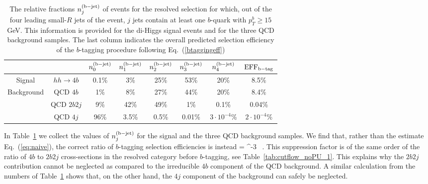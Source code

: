 \begin{table}[t]
  \centering
  \small
  \begin{tabular}{|c|c|c|c|c|c|c|c|}
    \hline
  \multicolumn{2}{|c|}{}   &  $n^{\rm (b-jet)}_0$  &  $n^{\rm (b-jet)}_1$  &  $n^{\rm (b-jet)}_2$  & $n^{\rm (b-jet)}_3$ &
    $n^{\rm (b-jet)}_4$ & ${\rm EFF}_{\rm b-tag}$ \\
    \hline
    \hline
    Signal  &  $hh\to 4b$  &   0.1\%    & 3\%     &  25\%     & 53\%     & 20\%      & 8.5\%  \\
    \hline
    \multirow{3}{*}{Background}  &  QCD $4b$  & 1\%      &  8\%    &   27\%   &  44\%     & 20\%       &  8.4\% \\
     &  QCD $2b2j$  &   9\%    & 42\%     &  49\%    & 1\%     &  0.1\%     & 0.04\%  \\
    &  QCD $4j$  &   96\%    &  3.5\%     & 0.5\%     &  0.01\%    & $3\cdot 10^{-4}$\%      &
    $2\cdot 10^{-4}$\%\\
    \hline
  \end{tabular}
  \caption{\small
    The relative fractions  $n^{\rm (b-jet)}_j$ of events for the resolved selection
    for which, out of the four leading small-$R$ jets of the
    event, $j$ jets
    contain at least one $b$-quark with $p_T^b\ge 15$ GeV.
    This information is provided
    for the di-Higgs signal events and for the three QCD background samples.
    The last column indicates the overall predicted
    selection efficiency of the $b$-tagging procedure following
    Eq.~(\ref{btaggingeff})
    \label{tab:btaggingcheck}
  }
  \end{table}

In Table~\ref{tab:btaggingcheck} we collect
the values of $n^{\rm (b-jet)}_j$ for the signal and the three QCD background samples.
%
We find that, rather than the estimate Eq.~(\ref{eq:naive}),
the correct ratio of $b$-tagging selection efficiencies is instead
\be
{}=
   ^{-3} \, .
  \ee
  This suppression factor is of the same order of the ratio of $4b$ to $2b2j$ cross-sections
  in the resolved category before $b$-tagging, see Table~\ref{tab:cutflow_noPU_1}.
    This explains why the $2b2j$ contribution cannot be neglected as compared
    to the irreducible $4b$ component of the QCD background.
    A similar calculation from the numbers of Table~\ref{tab:btaggingcheck} shows
    that, on the other hand, the $4j$ component of the background can safely
    be neglected.
    





%
